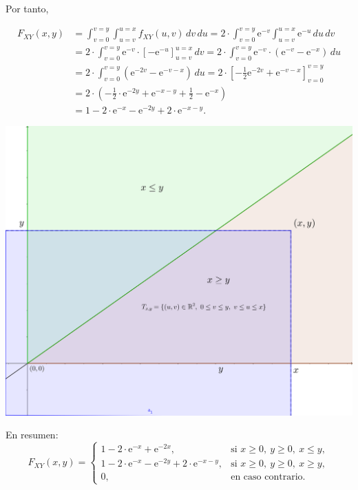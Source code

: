 \documentclass[]{book}
\begin{document}
Por tanto,

\[
\begin{array}{rl}
F_{XY}(x,y) &=  \int_{v=0}^{v=y}\int_{u=v}^{u=x} f_{XY}(u,v)\,dv\,du= 2\cdot\int_{v=0}^{v=y} \mathrm{e}^{-v}\int_{u=v}^{u=x} \mathrm{e}^{-u}\,du\,dv \\
&=  2 \cdot\int_{v=0}^{v=y} \mathrm{e}^{-v}\cdot\left[-\mathrm{e}^{-u}\right]_{u=v}^{u=x}\, dv  = 2 \cdot\int_{v=0}^{v=y} \mathrm{e}^{-v}\cdot (\mathrm{e}^{-v}-\mathrm{e}^{-x})\, du \\ 
&=  2 \cdot\int_{v=0}^{v=y} \left(\mathrm{e}^{-2v}-\mathrm{e}^{-v-x}\right)\, du=2 \cdot\left[-\frac{1}{2}\mathrm{e}^{-2v}+\mathrm{e}^{-v-x}\right]_{v=0}^{v=y}  
\\ &=  2\cdot\left(-\frac{1}{2}\cdot\mathrm{e}^{-2y}+\mathrm{e}^{-x-y}+\frac{1}{2}-\mathrm{e}^{-x}\right) \\&=  1-2\cdot\mathrm{e}^{-x}-\mathrm{e}^{-2y}+2\cdot\mathrm{e}^{-x-y}.
\end{array}
\]

\includegraphics{Images/Ejemplo2Bidi4.png}

En resumen:
\[
F_{XY}(x,y)=\begin{cases}
1-2\cdot\mathrm{e}^{-x}+\mathrm{e}^{-2x}, & \mbox{si }x\geq 0,\ y\geq 0,\ x\leq y,\\
1-2\cdot\mathrm{e}^{-x}-\mathrm{e}^{-2y}+2\cdot\mathrm{e}^{-x-y}, & \mbox{si }x\geq 0,\ y\geq 0,\ x\geq y,\\
0, & \mbox{en caso contrario.}
\end{cases}
\]
\end{document}
